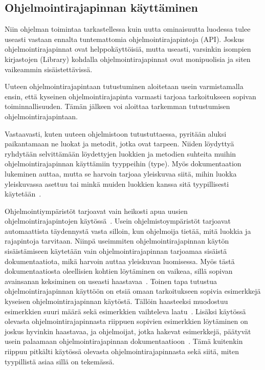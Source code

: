 \documentclass[finnish]{tktltiki2}
\theoremstyle{definition}
\theoremstyle{remark}
\begin{document}
\subsection{Ohjelmointirajapinnan käyttäminen}
Niin ohjelman toimintaa tarkastellessa kuin uutta ominaisuutta luodessa tulee useasti vastaan ennalta tuntemattomia ohjelmointirajapintoja (API). Joskus ohjelmointirajapinnat ovat helppokäyttöisiä, mutta useasti, varsinkin isompien kirjastojen (Library) kohdalla ohjelmointirajapinnat ovat monipuolisia ja siten vaikeammin sisäistettävissä.

Uuteen ohjelmointirajapintaan tutustuminen aloitetaan usein varmistamalla ensin, että kyseinen ohjelmointirajapinta varmasti tarjoaa tarkoitukseen sopivan toiminnallisuuden. Tämän jälkeen voi aloittaa tarkemman tutustumisen ohjelmointirajapintaan.

Vastaavasti, kuten uuteen ohjelmistoon tutustuttaessa, pyritään aluksi paikantamaan ne luokat ja metodit, jotka ovat tarpeen. Niiden löydyttyä ryhdytään selvittämään löydettyjen luokkien ja metodien suhteita muihin ohjelmointirajapinnan käyttämiin tyyppeihin (type). Myös dokumentaation lukeminen auttaa, mutta se harvoin tarjoaa yleiskuvaa siitä, mihin luokka yleiskuvassa asettuu tai minkä muiden luokkien kanssa sitä tyypillisesti käytetään~\cite{asking-and-answering-api-questions}.

Ohjelmointiympäristöt tarjoavat vain heikosti apua uusien ohjelmointirajapintojen käytössä~\cite{jungloid-mining}. Usein ohjelmistoympäristöt tarjoavat automaattista täydennystä vasta silloin, kun ohjelmoija tietää, mitä luokkia ja rajapintoja tarvitaan. Niinpä useimmiten ohjelmointirajapinnan käytön sisäistämiseen käytetään vain ohjelmointirajapinnan tarjoamaa sisäistä dokumentaatiota, mikä harvoin auttaa yleiskuvan luomisessa. Myös tästä dokumentaatiosta oleellisien kohtien löytäminen on vaikeaa, sillä sopivan avainsanan keksiminen on useasti haastavaa~\cite{what-to-search-for}.
Toinen tapa tutustua ohjelmointirajapinnan käyttöön on etsiä omaan tarkoitukseen sopivia esimerkkejä kyseisen ohjelmointirajapinnan käytöstä. Tällöin haasteeksi muodostuu esimerkkien suuri määrä sekä esimerkkien vaihteleva laatu~\cite{example-overflow-social-media-for-code-recommendations}. Lisäksi käytössä olevasta ohjelmointirajapinnasta riippuen sopivien esimerkkien löytäminen on joskus hyvinkin haastavaa, ja ohjelmoijat, jotka hakevat esimerkkejä, päätyvät usein palaamaan ohjelmointirajapinnan dokumentaatioon~\cite{asking-and-answering-api-questions}. Tämä kuitenkin riippuu pitkälti käytössä olevasta ohjelmointirajapinnasta sekä siitä, miten tyypillistä asiaa sillä on tekemässä.
\end{document}
